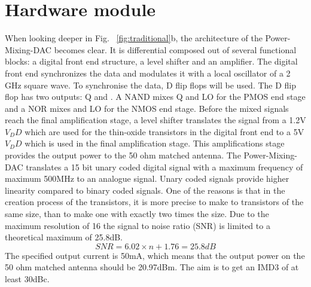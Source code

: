 \section{Hardware module}\label{sec:overview}
When looking deeper in Fig. ~\ref{fig:traditional}b, the architecture of the Power-Mixing-DAC becomes clear. It is differential composed out of several functional blocks: a digital front end structure, a level shifter and an amplifier. 
The digital front end synchronizes the data and modulates it with a local oscillator of a 2 GHz square wave. To synchronise the data, D flip flops will be used. The D flip flop has two outputs: Q and . A NAND mixes Q and LO for the PMOS end stage and a NOR mixes  and LO for the NMOS end stage. Before the mixed signals reach the final amplification stage, a level shifter translates the signal from a 1.2V $V_DD$ which are used for the thin-oxide transistors in the digital front end to a 5V $V_DD$ which is used in the final amplification stage. This amplifications stage provides the output power to the 50 ohm matched antenna.
The Power-Mixing-DAC translates a 15 bit unary coded digital signal with a maximum frequency of maximum 500MHz to an analogue signal. Unary coded signals provide higher linearity compared to binary coded signals. One of the reasons is that in the creation process of the transistors, it is more precise to make to transistors of the same size, than to make one with exactly two times the size. Due to the maximum resolution of 16 the signal to noise ratio (SNR) is limited to a theoretical maximum of 25.8dB.
\begin{equation}
{SNR = 6.02 \times n + 1.76 = 25.8 dB}
\label{eq:SNR}
\end{equation}
The specified output current is 50mA, which means that the output power on the 50 ohm matched antenna should be 20.97dBm. The aim is to get an IMD3 of at least 30dBc.

